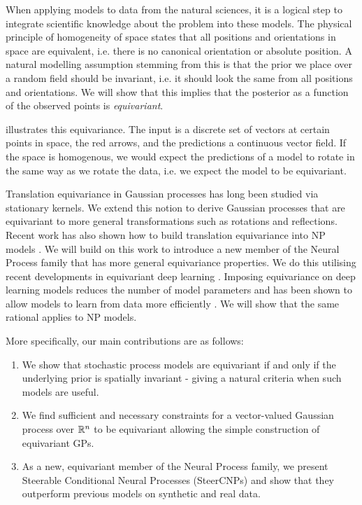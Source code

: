 When applying models to data from the natural sciences, it is a logical step to integrate scientific knowledge about the problem into these models.
The physical principle of homogeneity of space states that all positions and orientations in space are equivalent, i.e. there is no canonical orientation or absolute position.
A natural modelling assumption stemming from this is that the prior we place over a random field should be invariant, i.e. it should look the same from all positions and orientations.
We will show that this implies that the posterior as a function of the observed points is \textit{equivariant}.

 illustrates this equivariance.
The input is a discrete set of vectors at certain points in space, the red arrows, and the predictions a continuous vector field.
If the space is homogenous, we would expect the predictions of a model to rotate in the same way as we rotate the data, i.e. we expect the model to be equivariant.

Translation equivariance in Gaussian processes has long been studied via stationary kernels.
We extend this notion to derive Gaussian processes that are equivariant to more general transformations such as rotations and reflections.
Recent work has also shown how to build translation equivariance into NP models \parencite{ConvCNP,GaussNPs}.
We will build on this work to introduce a new member of the Neural Process family that has more general equivariance properties.
We do this utilising recent developments in equivariant deep learning \parencite{E2Steerable}.
Imposing equivariance on deep learning models reduces the number of model parameters and has been shown to allow models to learn from data more efficiently \parencite{G_CNNs,CyclicSymmetry,KondTrivGen}.
We will show that the same rational applies to NP models.

More specifically, our main contributions are as follows: \begin{enumerate} \item We show that stochastic process models are equivariant if and only if the underlying prior is spatially invariant - giving a natural criteria when such models are useful.
	\item We find sufficient and necessary constraints for a vector-valued Gaussian process over $\mathbb{R}^n$ to be equivariant allowing the simple construction of equivariant GPs.
	\item As a new, equivariant member of the Neural Process family, we present Steerable Conditional Neural Processes (SteerCNPs) and show that they outperform previous models on synthetic and real data.
\end{enumerate}

